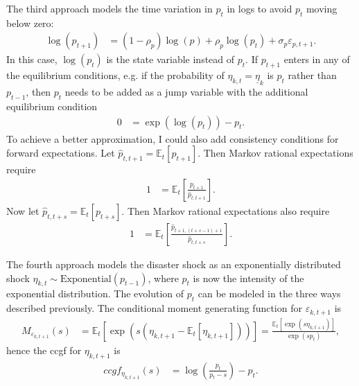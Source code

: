 \documentclass[12 pt, oneside]{article}
\theoremstyle{definition}
\theoremstyle{definition}
\theoremstyle{definition}
\newcommand{\E}{\mathbb{E}}
\begin{document}
The third approach models the time variation in $p_t$ in logs to avoid $p_t$ moving below zero:
\begin{align}
  \log(p_{t + 1}) & = (1 - \rho_p) \log(p) + \rho_p \log(p_t) + \sigma_p \varepsilon_{p, t + 1}.
\end{align}
In this case, $\log(p_t)$ is the state variable instead of $p_t$. If $p_{t + 1}$ enters in any of the equilibrium conditions, e.g. if the probability of $\eta_{k, t} = \underline{\eta}_k$ is $p_t$ rather than $p_{t - 1}$, then $p_t$ needs to be added as a jump variable with the additional equilibrium condition
\begin{align}
  0 & = \exp(\log(p_t)) - p_t.
\end{align}
To achieve a better approximation, I could also add consistency conditions for forward expectations. Let $\hat{p}_{t, t + 1} = \E_t[p_{t + 1}]$. Then Markov rational expectations require
\begin{align*}
  1 & = \E_t\left[\frac{p_{t + 1}}{\hat{p}_{t, t + 1}}\right].
\end{align*}
Now let $\hat{p}_{t, t + s} = \E_t[p_{t + s}]$. Then Markov rational expectations also require
\begin{align*}
  1 & = \E_t\left[\frac{\hat{p}_{t + 1, (t + s - 1) + 1}}{\hat{p}_{t, t + s}}\right].
\end{align*}

The fourth approach models the disaster shock as an exponentially distributed shock $\eta_{k, t} \sim \text{Exponential}(p_{t - 1})$, where $p_t$ is now the intensity of the exponential distribution. The evolution of $p_t$ can be modeled in the three ways described previously. The conditional moment generating function for $\varepsilon_{k, t + 1}$ is
\begin{align*}
  M_{\varepsilon_{k, t + 1}}(s) & = \E_t[\exp(s (\eta_{k, t + 1} - \E_t[\eta_{k, t + 1}]))] = \frac{\E_t[\exp(s \eta_{k, t + 1})]}{\exp(s p_t)},
\end{align*}
hence the ccgf for $\eta_{k, t + 1}$ is
\begin{align}
  ccgf_{\eta_{k, t + 1}}(s) & = \log\left(\frac{p_t}{p_t - s}\right) - p_t.
\end{align}
\end{document}
